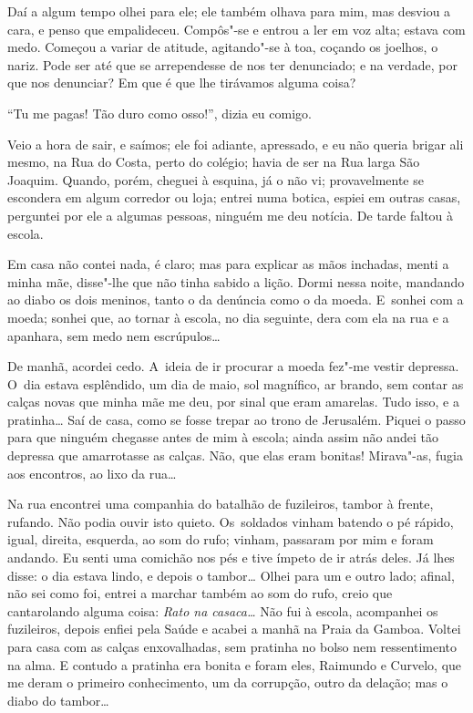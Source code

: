 Daí a algum tempo olhei para ele; ele também olhava para mim, mas
desviou a cara, e penso que empalideceu. Compôs"-se e entrou a ler em voz
alta; estava com medo. Começou a variar de atitude, agitando"-se à toa,
coçando os joelhos, o nariz. Pode ser até que se arrependesse de nos ter
denunciado; e na verdade, por que nos denunciar? Em que é que lhe
tirávamos alguma coisa?

``Tu me pagas! Tão duro como osso!'', dizia eu comigo.

Veio a hora de sair, e saímos; ele foi adiante, apressado, e eu não
queria brigar ali mesmo, na Rua do Costa, perto do colégio; havia de ser
na Rua larga São Joaquim. Quando, porém, cheguei à esquina, já o não vi;
provavelmente se escondera em algum corredor ou loja; entrei numa
botica, espiei em outras casas, perguntei por ele a algumas pessoas,
ninguém me deu notícia. De tarde faltou à escola.

Em casa não contei nada, é claro; mas para explicar as mãos inchadas,
menti a minha mãe, disse"-lhe que não tinha sabido a lição. Dormi nessa
noite, mandando ao diabo os dois meninos, tanto o da denúncia como o da
moeda. E~sonhei com a moeda; sonhei que, ao tornar à escola, no dia
seguinte, dera com ela na rua e a apanhara, sem medo nem escrúpulos\ldots{}

De manhã, acordei cedo. A~ideia de ir procurar a moeda fez"-me vestir
depressa. O~dia estava esplêndido, um dia de maio, sol magnífico, ar
brando, sem contar as calças novas que minha mãe me deu, por sinal que
eram amarelas. Tudo isso, e a pratinha\ldots{} Saí de casa, como se fosse
trepar ao trono de Jerusalém. Piquei o passo para que ninguém chegasse
antes de mim à escola; ainda assim não andei tão depressa que
amarrotasse as calças. Não, que elas eram bonitas! Mirava"-as, fugia aos
encontros, ao lixo da rua\ldots{}

Na rua encontrei uma companhia do batalhão de fuzileiros, tambor à
frente, rufando. Não podia ouvir isto quieto. Os~soldados vinham batendo
o pé rápido, igual, direita, esquerda, ao som do rufo; vinham, passaram
por mim e foram andando. Eu senti uma comichão nos pés e tive ímpeto de
ir atrás deles. Já lhes disse: o dia estava lindo, e depois o tambor\ldots{}
Olhei para um e outro lado; afinal, não sei como foi, entrei a marchar
também ao som do rufo, creio que cantarolando alguma coisa: \emph{Rato
na casaca\ldots{}} Não fui à escola, acompanhei os fuzileiros, depois enfiei
pela Saúde e acabei a manhã na Praia da Gamboa. Voltei para casa com as
calças enxovalhadas, sem pratinha no bolso nem ressentimento na alma. E
contudo a pratinha era bonita e foram eles, Raimundo e Curvelo, que me
deram o primeiro conhecimento, um da corrupção, outro da delação; mas o
diabo do tambor\ldots{}

